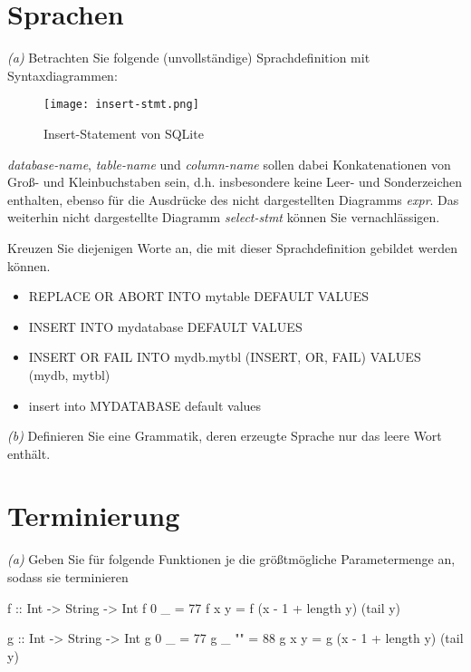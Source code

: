 \documentclass[11pt,a4paper,oneside,ngerman]{scrbook}
\begin{document}
\newpage


\section{Sprachen}
\emph{(a)} Betrachten Sie folgende (unvollständige) Sprachdefinition mit Syntaxdiagrammen:

\begin{figure}[htbp]
  \texttt{[image: insert-stmt.png]}
  \caption{Insert-Statement von SQLite}
\end{figure}
\emph{database-name}, \emph{table-name} und \emph{column-name} sollen dabei Konkatenationen von Groß- und Kleinbuchstaben sein, d.h. insbesondere keine Leer- und Sonderzeichen enthalten, ebenso für die Ausdrücke des nicht dargestellten Diagramms \emph{expr}. Das weiterhin nicht dargestellte Diagramm \emph{select-stmt} können Sie vernachlässigen.

Kreuzen Sie diejenigen Worte an, die mit dieser Sprachdefinition gebildet werden können.
\begin{itemize}[label={\Square}]
  \item REPLACE OR ABORT INTO mytable DEFAULT VALUES
  \item INSERT INTO mydatabase DEFAULT VALUES
  \item INSERT OR FAIL INTO mydb.mytbl (INSERT, OR, FAIL) VALUES (mydb, mytbl)
  \item insert into MYDATABASE default values
\end{itemize}


\emph{(b)} Definieren Sie eine Grammatik, deren erzeugte Sprache nur das leere Wort enthält.


\newpage



\section{Terminierung}

\emph{(a)} Geben Sie für folgende Funktionen je die größtmögliche Parametermenge an, sodass sie terminieren

\begin{code}
  f :: Int -> String -> Int
  f 0 _ = 77
  f x y = f (x - 1 + length y) (tail y)
\end{code}

\begin{code}
  g :: Int -> String -> Int
  g 0 _ = 77
  g _ "" = 88
  g x y = g (x - 1 + length y) (tail y)
\end{code}
\end{document}
